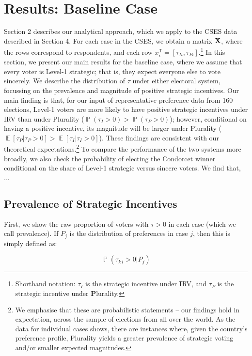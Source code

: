 \documentclass[12pt, letter]{article}
\DeclareMathOperator{\EX}{\mathbb{E}} %
\DeclareMathOperator{\Prob}{\mathbb{P}}
\newcommand*{\trans}{^{\mathsf{T}}} %
\begin{document}
\section{Results: Baseline Case}

Section 2 describes our analytical approach, which we apply to the CSES data described in Section 4. For each case in the CSES, we obtain a matrix $\bf X$, where the rows correspond to respondents, and each row $x_i\trans = [\tau_{Ii}, \tau_{Pi}]$.\footnote{Shorthand notation: $\tau_{I}$ is the strategic incentive under \textbf{I}RV, and $\tau_{P}$ is the strategic incentive under \textbf{P}lurality.} In this section, we present our main results for the baseline case, where we assume that every voter is Level-1 strategic; that is, they expect everyone else to vote sincerely. We describe the distribution of $\tau$ under either electoral system, focussing on the prevalence and magnitude of positive strategic incentives. Our main finding is that, for our input of representative preference data from 160 elections, Level-1 voters are more likely to have positive strategic incentives under IRV than under Plurality ($
\Prob(\tau_{I} > 0) > \Prob(\tau_{P} > 0)$); however, conditional on having a positive incentive, its magnitude will be larger under Plurality ($\EX[\tau_{P} | \tau_{P} > 0] > \EX[\tau_{I} | \tau_{I} > 0]$). These findings are consistent with our theoretical expectations.\footnote{We emphasise that these are probabilistic statements -- our findings hold in expectation, across the sample of elections from all over the world. As the data for individual cases shows, there are instances where, given the country's preference profile, Plurality yields a greater prevalence of strategic voting and/or smaller expected magnitudes.} To compare the performance of the two systems more broadly, we also check the probability of electing the Condorcet winner conditional on the share of Level-1 strategic versus sincere voters. We find that, ...

\subsection{Prevalence of Strategic Incentives}

First, we show the raw proportion of voters with $\tau > 0$ in each case (which we call prevalence). If $P_j$ is the distribution of preferences in case $j$, then this is simply defined as:

\begin{equation}
\Prob(\tau_{k \, i} > 0 | P_j)	
\end{equation}
\end{document}
